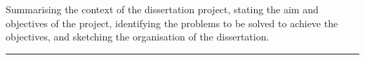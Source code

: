 
Summarising  the  context  of  the  dissertation  project,  stating  the  aim  and 
objectives of the project, identifying the problems to be solved to achieve the  objectives, 
and sketching the organisation of the dissertation.

\rule{\textwidth}{2pt}

\lipsum
